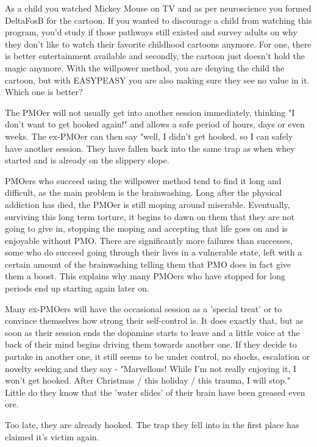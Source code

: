 As a child you watched Mickey Mouse on TV and as per neuroscience you formed DeltaFosB for the cartoon. If you wanted to discourage a child from watching this program, you'd study if those pathways still existed and survey adults on why they don't like to watch their favorite childhood cartoons anymore. For one, there is better entertainment available and secondly, the cartoon just doesn't hold the magic anymore. With the willpower method, you are denying the child the cartoon, but with EASYPEASY you are also making sure they see no value in it. Which one is better?

The PMOer will not usually get into another session immediately, thinking "I don't want to get hooked again!" and allows a safe period of hours, days or even weeks. The ex-PMOer can then say "well, I didn't get hooked, so I can safely have another session. They have fallen back into the same trap as when whey started and is already on the slippery slope.

PMOers who succeed using the willpower method tend to find it long and difficult, as the main problem is the brainwashing. Long after the physical addiction has died, the PMOer is still moping around miserable. Eventually, surviving this long term torture, it begins to dawn on them that they are not going to give in, stopping the moping and accepting that life goes on and is enjoyable without PMO. There are significantly more failures than successes, some who do succeed going through their lives in a vulnerable state, left with a certain amount of the brainwashing telling them that PMO does in fact give them a boost. This explains why many PMOers who have stopped for long periods end up starting again later on.

Many ex-PMOers will have the occasional session as a 'special treat' or to convince themselves how strong their self-control is. It does exactly that, but as soon as their session ends the dopamine starts to leave and a little voice at the back of their mind begins driving them towards another one. If they decide to partake in another one, it still seems to be under control, no shocks, escalation or novelty seeking and they say - "Marvellous! While I'm not really enjoying it, I won't get hooked. After Christmas / this holiday / this trauma, I will stop." Little do they know that the 'water slides' of their brain have been greased even ore.

Too late, they are already hooked. The trap they fell into in the first place has claimed it's victim again.

